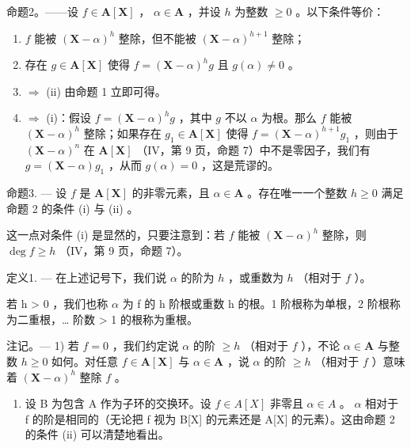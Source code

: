命题2。——设 \(f \in \mathbf{A}[\mathbf{X}]\) ， \(\alpha \in \mathbf{A}\) ，并设 \(h\) 为整数 \(\geqslant 0\) 。以下条件等价：

\begin{enumerate}
\def\labelenumi{(\roman{enumi})}
\item
  \(f\) 能被 \((\mathbf{X} - \alpha)^h\) 整除，但不能被 \((\mathbf{X} - \alpha)^{h + 1}\) 整除；
\item
  存在 \(g \in \mathbf{A}[\mathbf{X}]\) 使得 \(f = (\mathbf{X} - \alpha)^h g\) 且 \(g(\alpha) \neq 0\) 。
\item
  \(\Rightarrow\) (ii) 由命题 1 立即可得。
\item
  \(\Rightarrow\) (i)：假设 \(f = (\mathbf{X} - \alpha)^h g\) ，其中 \(g\) 不以 \(\alpha\) 为根。那么 \(f\) 能被 \((\mathbf{X} - \alpha)^h\) 整除；如果存在 \(g_1 \in \mathbf{A}[\mathbf{X}]\) 使得 \(f = (\mathbf{X} - \alpha)^{h + 1}g_1\) ，则由于 \((\mathbf{X} - \alpha)^n\) 在 \(\mathbf{A}[\mathbf{X}]\) （IV，第 9 页，命题 7）中不是零因子，我们有 \(g = (\mathbf{X} - \alpha)g_1\) ，从而 \(g(\alpha) = 0\) ，这是荒谬的。
\end{enumerate}

命题3. --- 设 \(f\) 是 \(\mathbf{A}[\mathbf{X}]\) 的非零元素，且 \(\alpha \in \mathbf{A}\) 。存在唯一一个整数 \(h \geqslant 0\) 满足命题 2 的条件 (i) 与 (ii) 。

这一点对条件 (i) 是显然的，只要注意到：若 \(f\) 能被 \((\mathbf{X} - \alpha)^h\) 整除，则 \(\deg f \geqslant h\) （IV，第 9 页，命题 7）。

定义1. --- 在上述记号下，我们说 \(\alpha\) 的阶为 \(h\) ，或重数为 \(h\) （相对于 \(f\) ）。

若 h \textgreater{} 0 ，我们也称 \(\alpha\) 为 f 的 h 阶根或重数 h 的根。1 阶根称为单根，2 阶根称为二重根，\ldots{} 阶数 \textgreater{} 1 的根称为重根。

注记。--- 1) 若 \(f=0\) ，我们约定说 \(\alpha\) 的阶 \(\geqslant h\) （相对于 \(f\) ），不论 \(\alpha\in\mathbf{A}\) 与整数 \(h\geqslant0\) 如何。对任意 \(f\in\mathbf{A}[\mathbf{X}]\) 与 \(\alpha\in\mathbf{A}\) ，说 \(\alpha\) 的阶 \(\geqslant h\) （相对于 \(f\) ）意味着 \((\mathbf{X}-\alpha)^{h}\) 整除 \(f\) 。

\begin{enumerate}
\def\labelenumi{\arabic{enumi})}
\setcounter{enumi}{1}
\tightlist
\item
  设 B 为包含 A 作为子环的交换环。设 \(f \in A[X]\) 非零且 \(\alpha \in A\) 。 \(\alpha\) 相对于 f 的阶是相同的（无论把 f 视为 B{[}X{]} 的元素还是 A{[}X{]} 的元素）。这由命题 2 的条件 (ii) 可以清楚地看出。
\end{enumerate}

